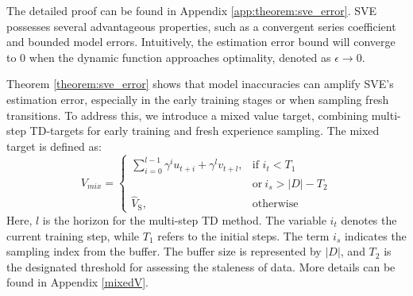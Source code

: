 The detailed proof can be found in Appendix \ref{app:theorem:sve_error}. SVE possesses several advantageous properties, such as a convergent series coefficient and bounded model errors. Intuitively, the estimation error bound will converge to 0 when the dynamic function approaches optimality, denoted as \(\epsilon \to 0\).


Theorem \ref{theorem:sve_error} shows that model inaccuracies can amplify SVE's estimation error, especially in the early training stages or when sampling fresh transitions. To address this, we introduce a mixed value target, combining multi-step TD-targets for early training and fresh experience sampling. The mixed target is defined as:
\begin{equation}
    V_{mix}=\begin{cases}
        \sum_{i=0}^{l-1}\gamma^i u_{t+i}+\gamma^l v_{t+l}, & \text{if } i_t<T_1 \  \\ &\text{or} \ i_s>|D|-T_2\\
        \hat{V}_\text{S}, & \text{otherwise}
    \end{cases}
\end{equation}
Here, \( l \) is the horizon for the multi-step TD method. The variable \( i_t \) denotes the current training step, while \( T_1 \) refers to the initial steps. The term \( i_s \) indicates the sampling index from the buffer. The buffer size is represented by \( |D| \), and \( T_2 \) is the designated threshold for assessing the staleness of data. More details can be found in Appendix \ref{mixedV}.




